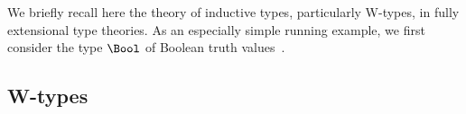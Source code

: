 We briefly recall here the theory of inductive types, particularly W-types, in fully extensional type theories. 
As an especially simple running example, we first consider the type $\Bool$ of Boolean truth values~\cite[Section~5.1]{NordstromB:marltt}. 


\subsection{W-types}\label{subsection:wtypes}




%
%
